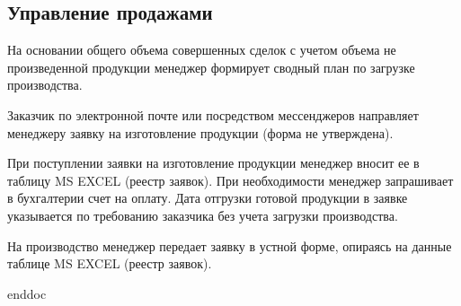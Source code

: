 \newpage
\subsection{Управление продажами}
\label{bp:SalesManagment}


На основании общего объема совершенных сделок с учетом объема не произведенной продукции менеджер формирует сводный план по загрузке производства. 

Заказчик по электронной почте или посредством мессенджеров направляет менеджеру заявку на изготовление продукции (форма не утверждена). 

При поступлении заявки на изготовление продукции менеджер вносит ее в таблицу MS EXCEL (реестр заявок). При необходимости менеджер запрашивает в бухгалтерии  счет на оплату.
Дата отгрузки готовой продукции в заявке указывается по требованию заказчика без учета загрузки производства. 


На производство менеджер передает заявку в устной форме, опираясь на данные таблице MS EXCEL (реестр заявок).




\clearpage
 {enddoc}